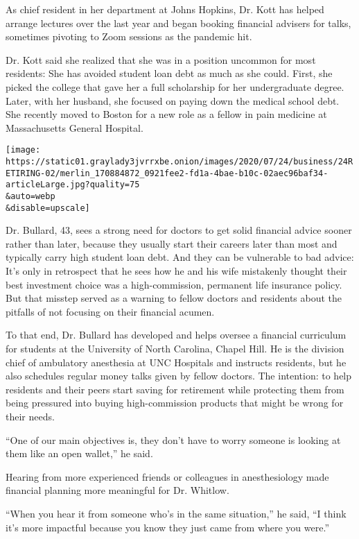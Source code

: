 As chief resident in her department at Johns Hopkins, Dr. Kott has
helped arrange lectures over the last year and began booking financial
advisers for talks, sometimes pivoting to Zoom sessions as the pandemic
hit.

Dr. Kott said she realized that she was in a position uncommon for most
residents: She has avoided student loan debt as much as she could.
First, she picked the college that gave her a full scholarship for her
undergraduate degree. Later, with her husband, she focused on paying
down the medical school debt. She recently moved to Boston for a new
role as a fellow in pain medicine at Massachusetts General Hospital.

\texttt{[image: https://static01.graylady3jvrrxbe.onion/images/2020/07/24/business/24RETIRING-02/merlin\_170884872\_0921fee2-fd1a-4bae-b10c-02aec96baf34-articleLarge.jpg?quality=75\\\&auto=webp\\\&disable=upscale]}

Dr. Bullard, 43, sees a strong need for doctors to get solid financial
advice sooner rather than later, because they usually start their
careers later than most and typically carry high student loan debt. And
they can be vulnerable to bad advice: It's only in retrospect that he
sees how he and his wife mistakenly thought their best investment choice
was a high-commission, permanent life insurance policy. But that misstep
served as a warning to fellow doctors and residents about the pitfalls
of not focusing on their financial acumen.

To that end, Dr. Bullard has developed and helps oversee a financial
curriculum for students at the University of North Carolina, Chapel
Hill. He is the division chief of ambulatory anesthesia at UNC Hospitals
and instructs residents, but he also schedules regular money talks given
by fellow doctors. The intention: to help residents and their peers
start saving for retirement while protecting them from being pressured
into buying high-commission products that might be wrong for their
needs.

``One of our main objectives is, they don't have to worry someone is
looking at them like an open wallet,'' he said.

Hearing from more experienced friends or colleagues in anesthesiology
made financial planning more meaningful for Dr. Whitlow.

``When you hear it from someone who's in the same situation,'' he said,
``I think it's more impactful because you know they just came from where
you were.''

